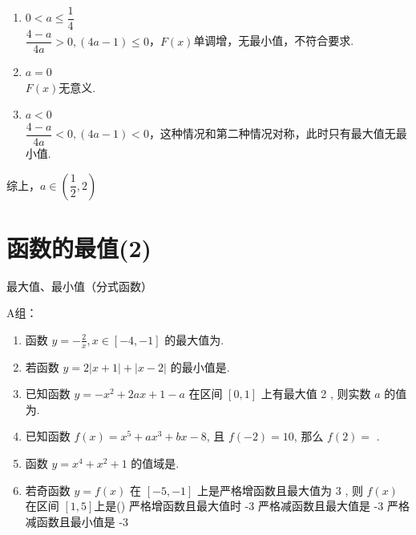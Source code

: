 \begin{enumerate}
\begin{jieda}
\begin{enumerate}
            故$2\sqrt{\dfrac{(4-a)(4a-1)}{4a}} > \sqrt{7}$，解得$a \in (\dfrac{1}{2}, 2)$ 
            \item $0 < a \leq \dfrac{1}{4}$ \\
            $\dfrac{4-a}{4a} > 0, (4a-1) \leq 0$，$F(x)$单调增，无最小值，不符合要求.
            \item $a = 0$\\
            $F(x)$无意义.
            \item $a < 0$ \\
            $\dfrac{4-a}{4a} < 0, (4a-1) < 0$，这种情况和第二种情况对称，此时只有最大值无最小值.
        \end{enumerate}
    \end{jieda}
    综上，$a \in (\dfrac{1}{2}, 2)$
    \begin{vspace_}
    \vsp[5]
    \end{vspace_}
\end{enumerate}


\section{函数的最值(2)}
\zsd 最大值、最小值（分式函数）

A组：
\begin{enumerate}
\item 函数 $y=-\frac{2}{x}, x \in[-4,-1]$ 的最大值为.

\item 若函数 $y=2|x+1|+|x-2|$ 的最小值是.

\item 已知函数 $y=-x^2+2 a x+1-a$ 在区间 $[0,1]$ 上有最大值 2 , 则实数 $a$ 的值为.

\item 已知函数 $f(x)=x^5+a x^3+b x-8$, 且 $f(-2)=10$, 那么 $f(2)=$ .

\item 函数 $y=x^4+x^2+1$ 的值域是\blkda{$[1,+\infty]$}.

\item 若奇函数 $y=f(x)$ 在 $[-5,-1]$ 上是严格增函数且最大值为 3 , 则 $f(x)$ 在区间 $[1,5]$上是\dotfill()
{严格增函数且最大值时 -3}
{严格减函数且最大值是 -3}
{严格减函数且最小值是 -3}
\end{enumerate}


